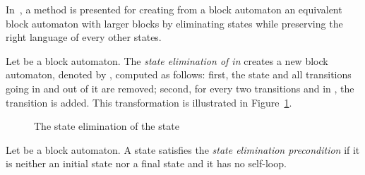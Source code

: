 \documentclass{llncs}
\begin{document}
	In~\cite{GMW01}, a method is presented for creating from a block automaton an equivalent block automaton with larger blocks by eliminating states while preserving the right language of every other states.
	
	Let  be a block automaton.
	The \emph{state elimination of  in } creates a new block automaton, denoted by , computed as follows: first, the state  and all transitions going in and out of it are removed; second, for every two transitions  and  in , the transition  is added.
	This transformation is illustrated in Figure~\ref{fg:StateElim}.

\begin{figure}[H]
	\begin{minipage}[b]{.48\linewidth}
		\centering
		
	
	\end{minipage}
	\hfill
	\begin{minipage}[b]{.48\linewidth}
		\centering
			

	\end{minipage}
	\caption{The state elimination of the state }
	\label{fg:StateElim}
\end{figure}

\begin{definition}
	Let  be a block automaton.
	A state  satisfies the \emph{state elimination precondition} if it is neither an initial state nor a final state and it has no self-loop.
\end{definition}
\end{document}
